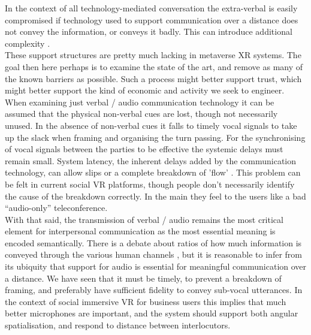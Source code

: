 In the context of all technology-mediated conversation the extra-verbal is easily compromised if technology used to support communication over a distance does not convey the information, or conveys it badly. This can introduce additional complexity \cite{Otsuka2005}.\\
These support structures are pretty much lacking in metaverse XR systems. The goal then here perhaps is to examine the state of the art, and remove as many of the known barriers as possible. Such a process might better support trust, which might better support the kind of economic and activity we seek to engineer.\\
When examining just verbal / audio communication technology it can be assumed that the physical non-verbal cues are lost, though not necessarily unused. In the absence of non-verbal cues it falls to timely vocal signals to take up the slack when framing and organising the turn passing. For the synchronising of vocal signals between the parties to be effective the systemic delays must remain small. System latency, the inherent delays added by the communication technology, can allow slips or a complete breakdown of 'flow' \cite{katagiri2007aiduti}. This problem can be felt in current social VR platforms, though people don't necessarily identify the cause of the breakdown correctly. In the main they feel to the users like a bad ``audio-only'' teleconference.\\
With that said, the transmission of verbal / audio remains the most critical element for interpersonal communication as the most essential meaning is encoded semantically. There is a debate about ratios of how much information is conveyed through the various human channels \cite{loomis2012sensory}, but it is reasonable to infer from its ubiquity that support for audio is essential for meaningful communication over a distance. We have seen that it must be timely, to prevent a breakdown of framing, and preferably have sufficient fidelity to convey sub-vocal utterances. In the context of social immersive VR for business users this implies that much better microphones are important, and the system should support both angular spatialisation, and respond to distance between interlocutors.  \\
